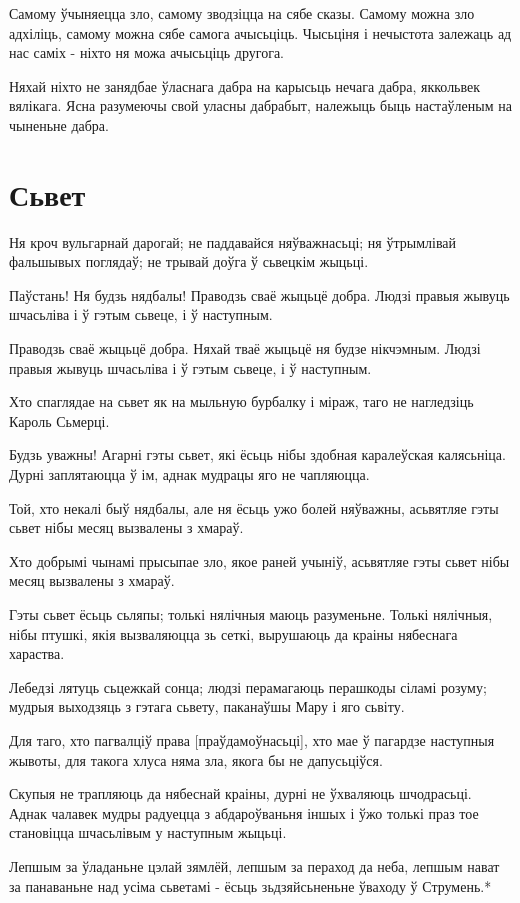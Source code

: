 \documentclass{article}
\begin{document}
Самому ўчыняецца зло, самому зводзіцца на сябе сказы. Самому можна
зло адхіліць, самому можна сябе самога ачысьціць. Чысьціня і нечыстота
залежаць ад нас саміх - ніхто ня можа ачысьціць другога.

Няхай ніхто не занядбае ўласнага дабра на карысьць нечага дабра,
яккольвек вялікага. Ясна разумеючы свой уласны дабрабыт, належыць быць
настаўленым на чыненьне дабра.

\section{Сьвет}

Ня кроч вульгарнай дарогай; не паддавайся няўважнасьці; ня
ўтрымлівай фальшывых поглядаў; не трывай доўга ў сьвецкім жыцьці.

Паўстань! Ня будзь нядбалы! Праводзь сваё жыцьцё добра. Людзі
правыя жывуць шчасьліва і ў гэтым сьвеце, і ў наступным.

Праводзь сваё жыцьцё добра. Няхай тваё жыцьцё ня будзе нікчэмным.
Людзі правыя жывуць шчасьліва і ў гэтым сьвеце, і ў наступным.

Хто спаглядае на сьвет як на мыльную бурбалку і міраж, таго не
нагледзіць Кароль Сьмерці.

Будзь уважны! Агарні гэты сьвет, які ёсьць нібы здобная каралеўская
калясьніца. Дурні заплятаюцца ў ім, аднак мудрацы яго не чапляюцца.

Той, хто некалі быў нядбалы, але ня ёсьць ужо болей няўважны,
асьвятляе гэты сьвет нібы месяц вызвалены з хмараў.

Хто добрымі чынамі прысыпае зло, якое раней учыніў, асьвятляе гэты
сьвет нібы месяц вызвалены з хмараў.

Гэты сьвет ёсьць сьляпы; толькі нялічныя маюць разуменьне. Толькі
нялічныя, нібы птушкі, якія вызваляюцца зь сеткі, вырушаюць да краіны
нябеснага хараства.

Лебедзі лятуць сьцежкай сонца; людзі перамагаюць перашкоды сіламі
розуму; мудрыя выходзяць з гэтага сьвету, паканаўшы Мару і яго сьвіту.

Для таго, хто пагвалціў права {[}праўдамоўнасьці{]}, хто мае ў
пагардзе наступныя жывоты, для такога хлуса няма зла, якога бы не
дапусьціўся.

Скупыя не трапляюць да нябеснай краіны, дурні не ўхваляюць
шчодрасьці. Аднак чалавек мудры радуецца з абдароўваньня іншых і ўжо
толькі праз тое становіцца шчасьлівым у наступным жыцьці.

Лепшым за ўладаньне цэлай зямлёй, лепшым за пераход да неба, лепшым
нават за панаваньне над усіма сьветамі - ёсьць зьдзяйсьненьне ўваходу ў
Струмень.*
\end{document}
